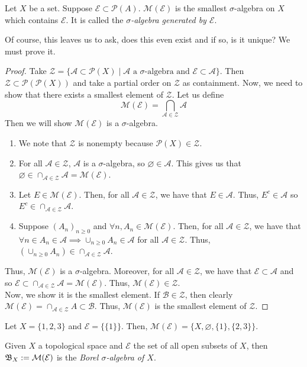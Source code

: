 \documentclass[11pt,leqno,oneside]{amsbook}
\numberwithin{thm}{section}
\renewcommand{\P}{\mathcal{P}}
\renewcommand{\A}{\mathcal{A}}
\newcommand{\M}{\mathcal{M}}
\newcommand{\Ep}{\mathcal{E}}
\newcommand{\s}{$\sigma$-} %
\begin{document}
\begin{defn}
  Let $X$ be a set. Suppose $\Ep \subset \P(A)$. $\M(\Ep)$ is the
  smallest \s algebra on $X$ which contains $\Ep$.  It is called the
  \emph{\s algebra generated by $\Ep$}.
\end{defn}
Of course, this leaves us to ask, does this even exist and if so, is
it unique? We must prove it.
\begin{proof}
  Take $\mathcal{Z} = \{\A \subset \P(X) \mid \A \text{ a }
  \sigma\text{-algebra and } \Ep \subset \A\}$. Then $\mathcal{Z}
  \subset \P(\P(X))$ and take a partial order on $\mathcal{Z}$ as
  containment. Now, we need to show that there exists a smallest
  element of $\mathcal{Z}$. Let us define \[
    \M(\Ep) = \bigcap_{\A \in \mathcal{Z}} \A
  \]
  Then we will show $\M(\Ep)$ is a \s algebra.
  \begin{enumerate}
  \item We note that $\mathcal{Z}$ is nonempty because $\P(X) \in \mathcal{Z}$.
  \item For all $\A \in \mathcal{Z}$, $\A$ is a \s algebra, so
    $\varnothing \in \A$. This gives us that $\varnothing \in \cap_{\A
      \in \mathcal{Z}} \A = \M(\Ep)$.
  \item Let $E \in \M(\Ep)$. Then, for all $\A \in \mathcal{Z}$, we have that
    $E \in \A$. Thus, $E^c \in \A$ so $E^c \in \cap_{\A \in \mathcal{Z}} \A$.
  \item Suppose $(A_n)_{n \geq 0}$ and $\forall n, A_n \in
    \M(\Ep)$. Then, for all $\A \in \mathcal{Z}$, we have that $\forall n \in
    A_n \in \A \implies \cup_{n \geq 0} A_n \in \A$ for all $\A
    \in \mathcal{Z}$. Thus, $(\cup_{n \geq 0} A_n) \in \cap_{\A \in \mathcal{Z}} \A$.
  \end{enumerate}
  Thus, $\M(\Ep)$ is a \s algebra. Moreover, for all $\A \in
  \mathcal{Z}$, we have that $\Ep \subset \A$ and so $\Ep \subset \cap_{\A \in
    \mathcal{Z}} \A = \M(\Ep)$. Thus, $\M(\Ep) \in \mathcal{Z}$. \\

  Now, we show it is the smallest element. If $\mathscr{B} \in
  \mathcal{Z}$, then clearly $\M(\Ep) = \cap_{\A \in \mathcal{Z}} A
  \subset \mathscr{B}$. Thus, $\M(\Ep)$ is the smallest element of
  $\mathcal{Z}$.
\end{proof}
\begin{example}
  Let $X = \{1,2,3\}$ and $\Ep = \{\{1\}\}$. Then, $\M(\Ep) = \{X,
  \varnothing, \{1\},\{2,3\}\}$.
\end{example}
\begin{defn}
  Given $X$ a topological space and $\Ep$ the set of all open subsets of $X$,
  then $\B_X := \M(\Ep)$ is the \emph{Borel \s algebra of $X$}.
\end{defn}
\end{document}
